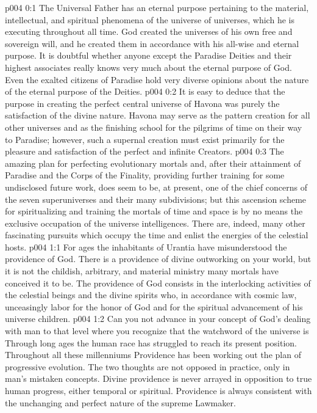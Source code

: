\author{Divine Counselor}
\vs p004 0:1 The Universal Father has an eternal purpose pertaining to the material, intellectual, and spiritual phenomena of the universe of universes, which he is executing throughout all time. God created the universes of his own free and sovereign will, and he created them in accordance with his all\hyp{}wise and eternal purpose. It is doubtful whether anyone except the Paradise Deities and their highest associates really knows very much about the eternal purpose of God. Even the exalted citizens of Paradise hold very diverse opinions about the nature of the eternal purpose of the Deities.\plusone
\vs p004 0:2 It is easy to deduce that the purpose in creating the perfect central universe of Havona was purely the satisfaction of the divine nature. Havona may serve as the pattern creation for all other universes and as the finishing school for the pilgrims of time on their way to Paradise; however, such a supernal creation must exist primarily for the pleasure and satisfaction of the perfect and infinite Creators.
\vs p004 0:3 The amazing plan for perfecting evolutionary mortals and, after their attainment of Paradise and the Corps of the Finality, providing further training for some undisclosed future work, does seem to be, at present, one of the chief concerns of the seven superuniverses and their many subdivisions; but this ascension scheme for spiritualizing and training the mortals of time and space is by no means the exclusive occupation of the universe intelligences. There are, indeed, many other fascinating pursuits which occupy the time and enlist the energies of the celestial hosts.
\vs p004 1:1 For ages the inhabitants of Urantia have misunderstood the providence of God. There is a providence of divine outworking on your world, but it is not the childish, arbitrary, and material ministry many mortals have conceived it to be. The providence of God consists in the interlocking activities of the celestial beings and the divine spirits who, in accordance with cosmic law, unceasingly labor for the honor of God and for the spiritual advancement of his universe children.
\vs p004 1:2 Can you not advance in your concept of God’s dealing with man to that level where you recognize that the watchword of the universe is  Through long ages the human race has struggled to reach its present position. Throughout all these millenniums Providence has been working out the plan of progressive evolution. The two thoughts are not opposed in practice, only in man’s mistaken concepts. Divine providence is never arrayed in opposition to true human progress, either temporal or spiritual. Providence is always consistent with the unchanging and perfect nature of the supreme Lawmaker.
